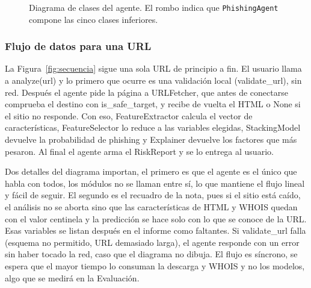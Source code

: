 \begin{figure}[ht]
{}
\caption{Diagrama de clases del agente. El rombo indica que \texttt{PhishingAgent} compone las cinco clases inferiores.}
\label{fig:clases}
\end{figure}



\subsubsection{Flujo de datos para una URL}

La Figura~\ref{fig:secuencia} sigue una sola URL de principio a fin. El usuario llama a analyze(url) y lo primero que ocurre es una validación local (validate\_url), sin red. Después el agente pide la página a URLFetcher, que antes de conectarse comprueba el destino con is\_safe\_target, y recibe de vuelta el HTML o None si el sitio no responde. Con eso, FeatureExtractor calcula el vector de características, FeatureSelector lo reduce a las variables elegidas, StackingModel devuelve la probabilidad de phishing y Explainer devuelve los factores que más pesaron. Al final el agente arma el RiskReport y se lo entrega al usuario. \newline

Dos detalles del diagrama importan, el primero es que el agente es el único que habla con todos, los módulos no se llaman entre sí, lo que mantiene el flujo lineal y fácil de seguir. El segundo es el recuadro de la nota, pues si el sitio está caído, el análisis no se aborta sino que las características de HTML y WHOIS quedan con el valor centinela y la predicción se hace solo con lo que se conoce de la URL. Esas variables se listan después en el informe como faltantes. Si validate\_url falla (esquema no permitido, URL demasiado larga), el agente responde con un error sin haber tocado la red, caso que el diagrama no dibuja. El flujo es síncrono, se espera que el mayor tiempo lo consuman la descarga y WHOIS y no los modelos, algo que se medirá en la Evaluación.
\newline


